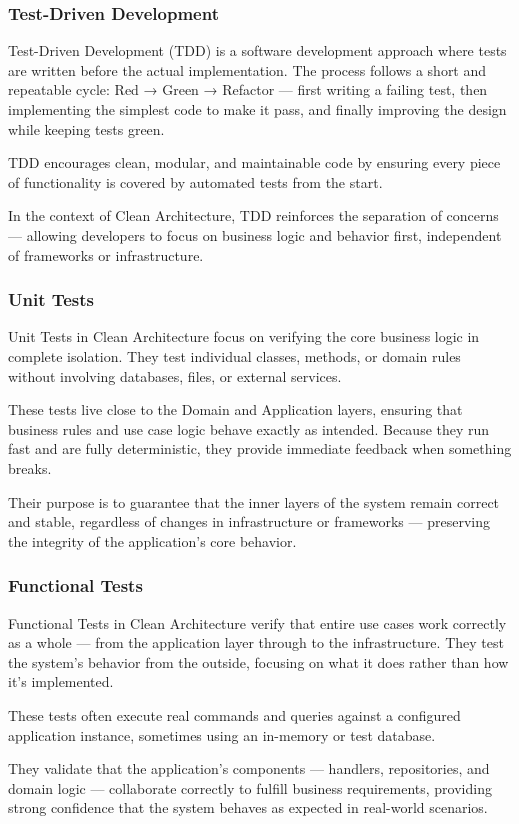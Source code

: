 \documentclass{beamer}
\begin{document}
\begin{frame}
\frametitle{Test-Driven Development}
Test-Driven Development (TDD) is a software development approach where tests are written before the actual implementation. The process follows a short and repeatable cycle: Red → Green → Refactor — first writing a failing test, then implementing the simplest code to make it pass, and finally improving the design while keeping tests green.

TDD encourages clean, modular, and maintainable code by ensuring every piece of functionality is covered by automated tests from the start.

In the context of Clean Architecture, TDD reinforces the separation of concerns — allowing developers to focus on business logic and behavior first, independent of frameworks or infrastructure.
\end{frame}

\begin{frame}
\frametitle{Unit Tests}
Unit Tests in Clean Architecture focus on verifying the core business logic in complete isolation. They test individual classes, methods, or domain rules without involving databases, files, or external services.

These tests live close to the Domain and Application layers, ensuring that business rules and use case logic behave exactly as intended. Because they run fast and are fully deterministic, they provide immediate feedback when something breaks.

Their purpose is to guarantee that the inner layers of the system remain correct and stable, regardless of changes in infrastructure or frameworks — preserving the integrity of the application’s core behavior.
\end{frame}

\begin{frame}
\frametitle{Functional Tests}
Functional Tests in Clean Architecture verify that entire use cases work correctly as a whole — from the application layer through to the infrastructure. They test the system’s behavior from the outside, focusing on what it does rather than how it’s implemented.

These tests often execute real commands and queries against a configured application instance, sometimes using an in-memory or test database.

They validate that the application’s components — handlers, repositories, and domain logic — collaborate correctly to fulfill business requirements, providing strong confidence that the system behaves as expected in real-world scenarios.
\end{frame}
\end{document}
